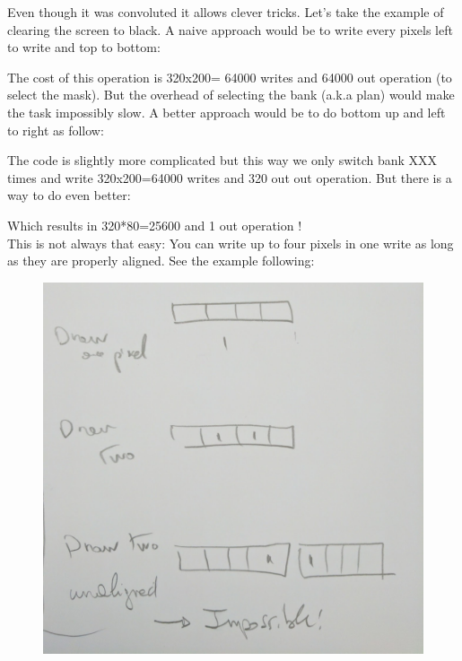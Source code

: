 Even though it was convoluted it allows clever tricks. Let's take the example of clearing the screen to black. A naive approach would be to write every pixels left to write and top to bottom:




The cost of this operation is 320x200= 64000 writes and 64000 out operation (to select the mask).
But the overhead of selecting the bank (a.k.a plan) would make the task impossibly slow. A better approach would be to do bottom up and left to right as follow:



The code is slightly more complicated but this way we only switch bank XXX times and write 320x200=64000 writes and  320 out out operation. But there is a way to do even better: 



Which results in 320*80=25600 and 1 out operation !\\

This is not always that easy: You can write up to four pixels in one write as long as they are properly aligned. See the example following:
\begin{figure}[H]
  \centering
 \includegraphics[scale=0.3]{imgs//vga_multiple_pixel_write.png}
\end{figure}





















